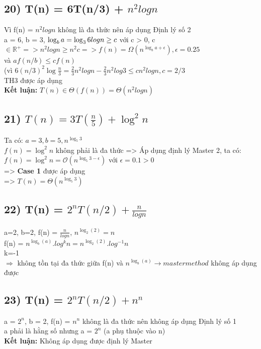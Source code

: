 \documentclass[10pt,a4paper]{article}
\begin{document}
\subsection*{20) T(n) = 6T(n/3) + $n^2logn$}
Vì f(n) = $n^2logn$ không là đa thức nên áp dụng Định lý số 2\\
a = 6, b = 3, $\log_b{a} = \log_3{6} \\
logn \geq c$ với c > 0, c $\in \mathbb{R^+} => n^2logn \geq  n^2c => f(n) = \Omega(n^{\log_b{a}+\epsilon}), \epsilon = 0.25$  \\
và $af(n/b) \leq cf(n)$ \\
(vì $6(n/3)^2\log{\frac{n}{3}} = \frac{2}{3}n^2logn - \frac{2}{3}n^2log3 \leq cn^2logn, c = 2/3$ \\
TH3 được áp dụng\\
\textbf{Kết luận: }$T(n) \in \Theta(f(n)) = \Theta(n^2logn)$
\subsection*{21) $T(n) = 3T(\frac{n}{5}) + \log^2{n}$}
Ta có: $a = 3,b=5,n^{\log_5{3}}$\\
$f(n) = \log^2{n}$ không phải là đa thức => Áp dụng định lý Master 2, ta có:\\
$f(n) = \log^2{n} = \mathcal{O}(n^{\log_5{3}-\epsilon})$ với $\epsilon = 0.1 > 0$ \\
=> \textbf{Case 1} được áp dụng \\
=> $T(n) = \Theta(n^{\log_5{3}})$

\subsection*{22) T(n) = $2^nT(n/2) + \frac{n}{logn}$}
a=2, b=2, f(n) = $\frac{n}{logn}$, $n^{\log_2(2)} = n$\\
f(n) = $n^{\log_b(a)}.log^kn = n^{\log_2(2)}.log^{-1}n $\\
k=-1\\
$\Rightarrow$ không tồn tại đa thức giữa  f(n) và  $n^{\log_b(a)} \rightarrow master method$ không áp dụng được
\subsection*{23) T(n) = $2^nT(n/2) + n^n$}
a = $2^n$, b = 2, f(n) = $n^n$ không là đa thức nên không áp dụng Định lý số 1 \\
a phải là hằng số nhưng a = $2^n$ (a phụ thuộc vào n) \\
\textbf{Kết luận: }Không áp dụng được định lý Master
\end{document}
